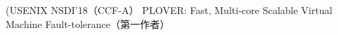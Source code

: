 \cventry
{(USENIX NSDI'18（CCF-A）} %
{PLOVER: Fast, Multi-core Scalable Virtual Machine Fault-tolerance（第一作者）} %
{} %
{} %
{ %
}
